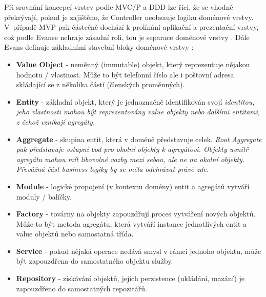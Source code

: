 Při srovnání koncepcí vrstev podle MVC/P a DDD lze říci, že se vhodně překrývají, pokud je zajištěno, že Controller neobsauje logiku doménové vrstvy. V~případě MVP pak částečně dochází k prolínání aplikační a prezentační vrstvy, což podle Evanse nehraje zásadní roli, tou je separace doménové vrstvy \cite{EvansDDD}. Dále Evans definuje základními stavební bloky doménové vrstvy \cite{EvansDDD}:
\begin{itemize}
	\item \textbf{Value Object} - neměnný (immutable) objekt, který reprezentuje nějakou hodnotu / vlastnost. Může to být telefonní číslo ale i poštovní adresa skládající se z několika částí (členských proměnných).
	\item \textbf{Entity} - základní objekt, který je jednoznačně identifikován svojí \it{identitou}, jeho vlastnosti mohou být reprezentovány value objekty nebo dalšími entitami, z čehož vznikají agregáty.

	\item \textbf{Aggregate} - skupina entit, která v doméně představuje celek. \it{Root Aggregate} pak představuje vstupní bod pro okolní objekty k agregátovi. Objekty uvnitř agregátu mohou mít libovolné vazby mezi sebou, ale ne na okolní objekty. Převážná část business logiky by se měla odehrávat právě zde.
	\item \textbf{Module} - logické propojení (v kontextu domény) entit a agregátů vytváří moduly / balíčky.
	\item \textbf{Factory} - továrny na objekty zapouzdřují proces vytváření nových objektů. Může to být metoda agregátu, která vytváří instance jednotlivých entit a value objektů nebo samostatná třída.
	\item \textbf{Service} - pokud nějaká operace nedává smysl v rámci jednoho objektu, může být zapouzdřena do samostatného objektu služby.
	\item \textbf{Repository} - získávání objektů, jejich perzistence (ukládání, mazání) je zapouzdřeno do samostatných repozitářů.
\end{itemize}